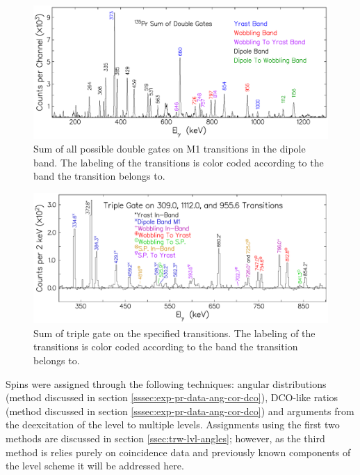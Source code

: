 \begin{figure}[h!]
\centerline{\includegraphics[width=\textwidth]{./img/c4/sum_of_dbl_gate_ev.pdf}}
	\caption{Sum of all possible double gates on M1 transitions in the dipole band. The labeling of the transitions is color coded according to the band the transition belongs to. \label{fig:chp4-spec-dbl-gates}}
\end{figure}
\begin{figure}[h!]
\centerline{\includegraphics[width=\textwidth]{./img/c4/trip_gate_ev.pdf}}
	\caption{Sum of triple gate on the specified transitions. The labeling of the transitions is color coded according to the band the transition belongs to. \label{fig:chp4-spec-triple-gate}}
\end{figure}

Spins were assigned through the following techniques: angular distributions (method discussed in section \ref{sssec:exp-pr-data-ang-cor-dco}), DCO-like ratios (method discussed in section \ref{sssec:exp-pr-data-ang-cor-dco}) and arguments from the deexcitation of the level to multiple levels. Assignments using the first two methods are discussed in section \ref{ssec:trw-lvl-angles}; however, as the third method is relies purely on coincidence data and previously known components of the level scheme it will be addressed here.

